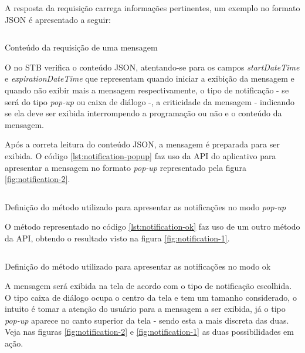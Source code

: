 A resposta da requisição carrega informações pertinentes, um exemplo no formato
JSON é apresentado a seguir:

\begin{listing}[ht!]
\inputminted{json}{codigos/message.json}
\caption{Conteúdo da requisição de uma mensagem}
\label{lst:notification-json}
\end{listing}

O \software[] no STB verifica o conteúdo JSON, atentando-se para os campos 
\textit{startDateTime} e \textit{expirationDateTime} que representam quando 
iniciar a exibição da mensagem e quando não exibir mais a mensagem 
respectivamente, o tipo de notificação - se será do tipo \textit{pop-up} ou
caixa de diálogo -, a criticidade da mensagem - indicando se ela deve ser
exibida interrompendo a programação ou não e o conteúdo da mensagem. 

Após a correta leitura do conteúdo JSON, a mensagem é preparada para ser 
exibida. O código \ref{lst:notification-popup} faz uso da API do aplicativo
\xbmc[] para apresentar a mensagem no formato \textit{pop-up} representado pela
figura \ref{fig:notification-2}.

\begin{listing}[ht!]
\inputminted{python}{codigos/notification-popup.py}
\caption{Definição do método utilizado para apresentar as notificações no modo
\textit{pop-up}}
\label{lst:notification-popup}
\end{listing}

O método representado no código \ref{lst:notification-ok} faz uso de um outro 
método da API, obtendo o resultado visto na figura \ref{fig:notification-1}.

\begin{listing}[ht!]
\inputminted{python}{codigos/notification-ok.py}
\caption{Definição do método utilizado para apresentar as notificações no modo
ok}
\label{lst:notification-ok}
\end{listing}

A mensagem será exibida na tela de acordo com o tipo de notificação escolhida. O
tipo caixa de diálogo ocupa o centro da tela e tem um tamanho considerado, o 
intuito é tomar a atenção do usuário para a mensagem a ser exibida, já o tipo
\textit{pop-up} aparece no canto superior da tela - sendo esta a mais discreta 
das duas. Veja nas figuras \ref{fig:notification-2} e \ref{fig:notification-1} 
as duas possibilidades em ação.



